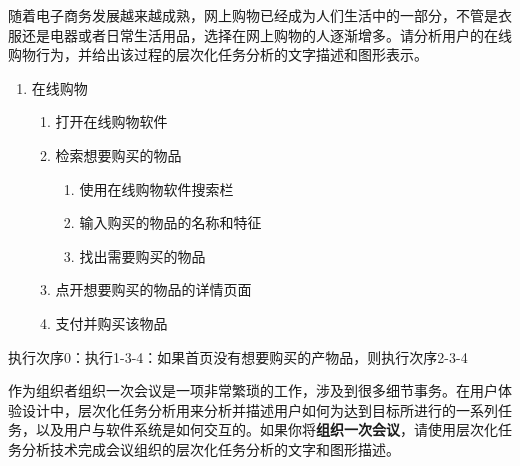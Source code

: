 \begin{problem}[2021]
随着电子商务发展越来越成熟，网上购物已经成为人们生活中的一部分，不管是衣服还是电器或者日常生活用品，选择在网上购物的人逐渐增多。请分析用户的在线购物行为，并给出该过程的层次化任务分析的文字描述和图形表示。
\end{problem}

\begin{solution}
\vspace{-0.8em}
\begin{multicols}{2}
    \begin{enumerate}[label=\arabic*.,start=0]
        \item 在线购物
        \vspace{-0.3em}
        \begin{enumerate}[label=\arabic*.]
            \item 打开在线购物软件
            \item 检索想要购买的物品
            \begin{enumerate}[label=2.\arabic*]
                \item 使用在线购物软件搜索栏
                \item 输入购买的物品的名称和特征
                \item 找出需要购买的物品
            \end{enumerate}
            \item 点开想要购买的物品的详情页面
            \item 支付并购买该物品
        \end{enumerate}
    \end{enumerate}
\end{multicols}
\vspace{-1em}

执行次序0：执行1-3-4：如果首页没有想要购买的产物品，则执行次序2-3-4
\end{solution}



\begin{problem}[2022]
作为组织者组织一次会议是一项非常繁琐的工作，涉及到很多细节事务。在用户体验设计中，层次化任务分析用来分析并描述用户如何为达到目标所进行的一系列任务，以及用户与软件系统是如何交互的。如果你将\textbf{组织一次会议}，请使用层次化任务分析技术完成会议组织的层次化任务分析的文字和图形描述。
\end{problem}

